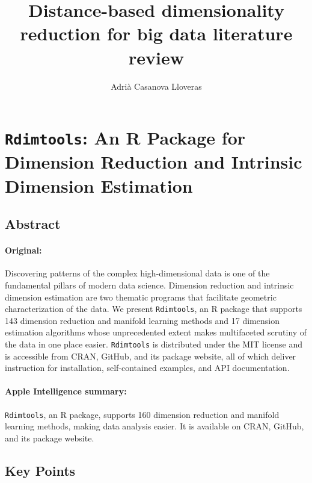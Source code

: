 \documentclass[a4paper,12pt]{article}
\title{Distance-based dimensionality reduction for big data literature review}
\author{Adrià Casanova Lloveras}
\begin{document}
\maketitle

\tableofcontents
\pagebreak

\section{\texttt{Rdimtools}: An R Package for Dimension Reduction
and Intrinsic Dimension Estimation \texorpdfstring{\cite{Rdimtools}}{}}
\label{sec:rdimtools}


\subsection{Abstract}

\paragraph{Original:} Discovering patterns of the complex high-dimensional data is one of the fundamental pillars of modern data science. Dimension reduction and intrinsic dimension estimation are two thematic programs that facilitate geometric characterization of the data. We present \texttt{Rdimtools}, an R package that supports 143 dimension reduction and manifold learning methods and 17 dimension estimation algorithms whose unprecedented extent makes multifaceted scrutiny of the data in one place easier. \texttt{Rdimtools} is distributed under the MIT license and is accessible from CRAN, GitHub, and its package website, all of which deliver instruction for installation, self-contained examples, and API documentation.

\paragraph{Apple Intelligence summary:} \texttt{Rdimtools}, an R package, supports 160 dimension reduction and manifold learning methods, making data analysis easier. It is available on CRAN, GitHub, and its package website.

\subsection{Key Points}
\end{document}
